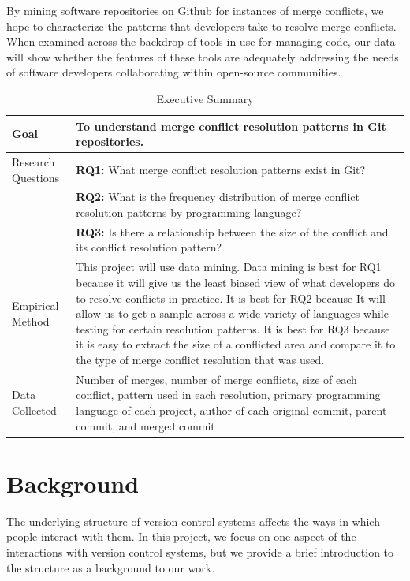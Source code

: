 \documentclass{sig-alternate-05-2015}
\begin{document}
By mining software repositories on Github for instances of merge conflicts, we hope to characterize the patterns that developers take to resolve merge conflicts. When examined across the backdrop of tools in use for managing code, our data will show whether the features of these tools are adequately addressing the needs of software developers collaborating within open-source communities.

\begin{table}
\centering
\caption{Executive Summary}
\begin{tabular}{| l | p{10cm} | } \hline
Goal & To understand merge conflict resolution patterns in Git repositories. \\ \hline
Research Questions  & \textbf{RQ1:} What merge conflict resolution patterns exist in Git?\\
& \textbf{RQ2:} What is the frequency distribution of merge conflict resolution patterns by programming language?\\
& \textbf{RQ3:} Is there a relationship between the size of the conflict and its conflict resolution pattern?\\ \hline
Empirical Method & This project will use data mining. Data mining is best for RQ1 because it will give us the least biased view of what developers do to resolve conflicts in practice. It is best for RQ2 because It will allow us to get a sample across a wide variety of languages while testing for certain resolution patterns. It is best for RQ3 because it is easy to extract the size of a conflicted area and compare it to the type of merge conflict resolution that was used.\\ \hline
Data Collected & Number of merges, number of merge conflicts, size of each conflict, pattern used in each resolution, primary programming language of each project, author of each original commit, parent commit, and merged commit\\
\hline\end{tabular}
\label{table:t1}
\end{table}

\section{Background}\label{Background}

The underlying structure of version control systems affects the ways in which people interact with them. In this project, we focus on one aspect of the interactions with version control systems, but we provide a brief introduction to the structure as a background to our work.
\end{document}
